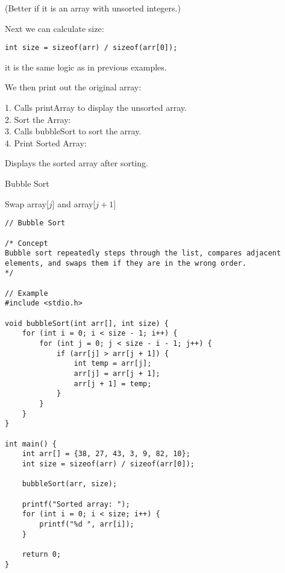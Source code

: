 \documentclass[a4paper,12pt]{article}
\begin{document}
(Better if it is an array with unsorted integers.)

Next we can calculate size:

\verb|int size = sizeof(arr) / sizeof(arr[0]);|

it is the same logic as in previous examples.

We then print out the original array:

1. Calls printArray to display the unsorted array.\\
2. Sort the Array:\\
3. Calls bubbleSort to sort the array.\\
4. Print Sorted Array:

Displays the sorted array after sorting.
\begin{algorithm}
\caption{Bubble Sort}
\begin{algorithmic}[1]
                \State Swap array[$j$] and array[$j + 1$]
            \EndIf
        \EndFor
    \EndFor
\EndProcedure
\end{algorithmic}
\end{algorithm}

\newpage

\lstset{language=C}
\begin{lstlisting}
// Bubble Sort

/* Concept
Bubble sort repeatedly steps through the list, compares adjacent elements, and swaps them if they are in the wrong order.
*/

// Example
#include <stdio.h>

void bubbleSort(int arr[], int size) {
    for (int i = 0; i < size - 1; i++) {
        for (int j = 0; j < size - i - 1; j++) {
            if (arr[j] > arr[j + 1]) {
                int temp = arr[j];
                arr[j] = arr[j + 1];
                arr[j + 1] = temp;
            }
        }
    }
}

int main() {
    int arr[] = {38, 27, 43, 3, 9, 82, 10};
    int size = sizeof(arr) / sizeof(arr[0]);

    bubbleSort(arr, size);

    printf("Sorted array: ");
    for (int i = 0; i < size; i++) {
        printf("%d ", arr[i]);
    }

    return 0;
}
\end{lstlisting}
\end{document}
